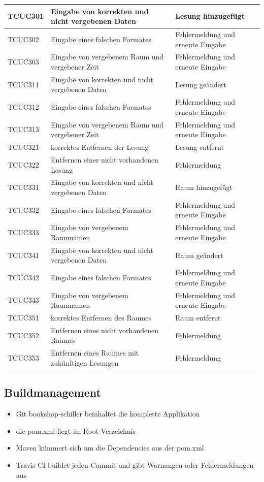\documentclass[a4paper]{article}
\begin{document}
\begin{longtable}{|p{50px}|p{200px}|p{100px}|}
	TCUC301 & Eingabe von korrekten und nicht vergebenen Daten & Lesung hinzugefügt \\ \hline
	TCUC302 & Eingabe eines falschen Formates & Fehlermeldung und erneute Eingabe \\ \hline
	TCUC303 & Eingabe von vergebenem Raum und vergebener Zeit & Fehlermeldung und erneute Eingabe \\ \hline
	TCUC311 & Eingabe von korrekten und nicht vergebenen Daten & Lesung geändert \\ \hline
	TCUC312 & Eingabe eines falschen Formates & Fehlermeldung und erneute Eingabe \\ \hline
	TCUC313 & Eingabe von vergebenem Raum und vergebener Zeit & Fehlermeldung und erneute Eingabe \\ \hline
	TCUC321 & korrektes Entfernen der Lesung & Lesung entfernt \\ \hline
	TCUC322 & Entfernen einer nicht vorhandenen Lesung & Fehlermeldung \\ \hline	
	TCUC331 & Eingabe von korrekten und nicht vergebenen Daten & Raum hinzugefügt \\ \hline
	TCUC332 & Eingabe eines falschen Formates & Fehlermeldung und erneute Eingabe \\ \hline
	TCUC333 & Eingabe von vergebenem Raumnamen & Fehlermeldung und erneute Eingabe \\ \hline
	TCUC341 & Eingabe von korrekten und nicht vergebenen Daten & Raum geändert \\ \hline
	TCUC342 & Eingabe eines falschen Formates & Fehlermeldung und erneute Eingabe \\ \hline
	TCUC343 & Eingabe von vergebenem Raumnamen & Fehlermeldung und erneute Eingabe \\ \hline
	TCUC351 & korrektes Entfernen des Raumes & Raum entfernt \\ \hline
	TCUC352 & Entfernen eines nicht vorhandenen Raumes & Fehlermeldung \\ \hline
	TCUC353 & Entfernen eines Raumes mit zukünftigen Lesungen & Fehlermeldung \\ \hline
\end{longtable}

\subsection{Buildmanagement}

\begin{itemize}
	\item Git bookshop-schiller beinhaltet die komplette Applikation
	\item die pom.xml liegt im Root-Verzeichnis
	\item Maven kümmert sich um die Dependencies aus der pom.xml
	\item Travis CI buildet jeden Commit und gibt Warnungen oder Fehlermeldungen aus
\end{itemize}
\end{document}
